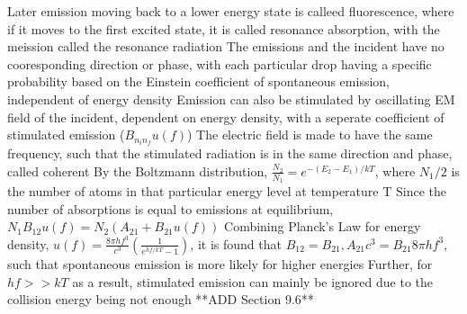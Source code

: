 \documentclass[11 pt, twoside]{article}
\newenvironment{outline*}
{
	\begin{outline}[enumerate]
	}
	{\end{outline}
}
\begin{document}
\begin{outline*}
		\3 Later emission moving back to a lower energy state is calleed fluorescence, where if it moves to the first excited state, it is called resonance absorption, with the meission called the resonance radiation
			\4 The emissions and the incident have no cooresponding direction or phase, with each particular drop having a specific probability based on the Einstein coefficient of spontaneous emission, independent of energy density
		\3 Emission can also be stimulated by oscillating EM field of the incident, dependent on energy density, with a seperate coefficient of stimulated emission ($B_{n_in_f}u(f)$)
			\4 The electric field is made to have the same frequency, such that the stimulated radiation is in the same direction and phase, called coherent
	\2 By the Boltzmann distribution, $\frac{N_2}{N_1} = e^{-(E_2 - E_1)/kT}$, where $N_1/2$ is the number of atoms in that particular energy level at temperature T
		\3 Since the number of absorptions is equal to emissions at equilibrium, $N_1B_{12}u(f) = N_2(A_{21} + B_{21}u(f))$
		\3 Combining Planck's Law for energy density, $u(f) = \frac{8\pi hf^3}{c^3}(\frac{1}{e^{hf/kT} - 1})$, it is found that $B_{12} = B_{21}, A_{21}c^3 = B_{21}8\pi hf^3$, such that spontaneous emission is more likely for higher energies
			\4 Further, for $hf >> kT$ as a result, stimulated emission can mainly be ignored due to the collision energy being not enough
\1 **ADD Section 9.6**
\end{outline*}
\end{document}
